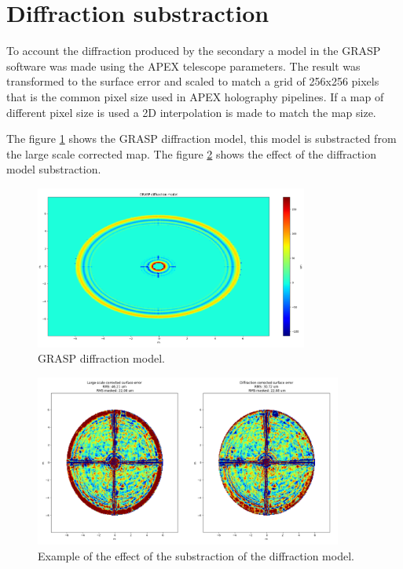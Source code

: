 \newpage
\section{Diffraction substraction}

To account the diffraction produced by the secondary a model in the GRASP software was made using the APEX telescope parameters.
The result was transformed to the surface error and scaled to match a grid of 256x256 pixels that is the common pixel size used in APEX holography pipelines. If a map of different pixel size is used a 2D interpolation is made to match the map size.

The figure \ref{fig:grasp_diffraction} shows the GRASP diffraction model, this model is substracted from the large scale corrected map. The figure \ref{fig:diffraction_corrected} shows the effect of the diffraction model substraction.


\begin{figure}
    \centering
    \includegraphics[width=0.8\textwidth]{images/grasp_diffraction_model.png}
    \caption{GRASP diffraction model.}
    \label{fig:grasp_diffraction}
\end{figure}


\begin{figure}
    \centering
    \includegraphics[width=0.9\textwidth]{images/diffraction_correction.png}
    \caption{Example of the effect of the substraction of the diffraction model.}
    \label{fig:diffraction_corrected}
\end{figure}



